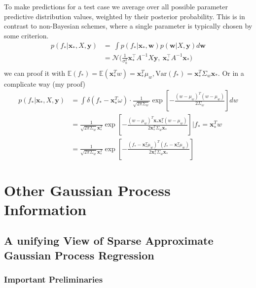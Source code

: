 \documentclass[10pt]{elegantbook}
\begin{document}
To make predictions for a test case we average over all possible parameter predictive distribution
values, weighted by their posterior probability. This is in contrast to non-Bayesian schemes, where a single parameter is typically chosen by some criterion. 
\begin{equation}
    \begin{aligned} 
        p ( f_{*} | \mathbf{x}_{*}, X, \mathbf{y} ) &=\ \int p ( f_{*} | \mathbf{x}_{*}, \mathbf{w} ) p ( \mathbf{w} | X, \mathbf{y} )  d \mathbf{w} \\ 
        &= \mathcal{N} \big ( \frac{1} {\sigma_{n}^{2}} \mathbf{x}_{*}^{\top} A^{-1} X \mathbf{y}, \ \mathbf{x}_{*}^{\top} A^{-1} \mathbf{x}_{*} \big ) \\ 
    \end{aligned} 
\end{equation}
we can proof it with $\mathbb{E}(f_*) = \mathbb E(\mathbf x_*^Tw) = \mathbf x_*^T\mu_w, \text{Var}(f_*) = \mathbf x_*^T \Sigma_w \mathbf x_*$. Or in a 
complicate way (my proof)
\begin{align*}
    p ( f_{*} | \mathbf{x}_{*}, X, \mathbf{y} )
    &=\int \delta(f_*-\mathbf x_*^T \omega)\cdot \frac{1}{\sqrt{2 \pi \Sigma_w}}\exp \left [ -\frac{(w-\mu_w)^T(w-\mu_w)}{2 \Sigma_w}\right ]dw \\
    &= \frac{1}{\sqrt{2 \pi \Sigma_w} \mathbf x_*^T}\exp \left [ -\frac{(w-\mu_w)^T\mathbf x_*\mathbf x_*^T(w-\mu_w)}{2 \mathbf x_*^T \Sigma_w  \mathbf x_*}\right ] | f_*=\mathbf x_*^T w \\
    &= \frac{1}{\sqrt{2 \pi \Sigma_w} \mathbf x_*^T}\exp \left [ -\frac{(f_*-\mathbf x_*^T\mu_w)^T(f_*-\mathbf x_*^T\mu_w)}{2 \mathbf x_*^T \Sigma_w  \mathbf x_*}\right ]
\end{align*}

\chapter{Other Gaussian Process Information}

\section{A unifying View of Sparse Approximate Gaussian Process Regression}

\subsection{Important Preliminaries}
\end{document}
